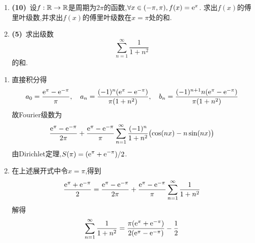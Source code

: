 \documentclass{ctexart}
\begin{document}
\begin{problem}[8.(15\songti{分})]
\begin{enumerate}[label=\tbf{(\arabic*)},topsep=0pt,parsep=0pt,itemsep=0pt,partopsep=0pt]
            \item \textbf{(10)}\ 设$f:\mathbb{R}\to\mathbb{R}$是周期为$2\pi$的函数,$\forall x\in(-\pi,\pi),f(x)=\mathrm{e}^x$.%
                求出$f(x)$的傅里叶级数,并求出$f(x)$的傅里叶级数在$x=\pi$处的和.
            \item \textbf{(5)}\ 求出级数
                \[\sum_{n=1}^{\infty}\dfrac{1}{1+n^2}\]
                的和.
        \end{enumerate}
\end{problem}
\begin{solution}
\begin{enumerate}[label=\tbf{(\arabic*)},topsep=0pt,parsep=0pt,itemsep=0pt,partopsep=0pt]
\item 直接积分得
\[a_0=\frac{\mathrm{e}^\pi-\mathrm{e}^{-\pi}}\pi,\quad
a_n=\frac{(-1)^n(\mathrm{e}^\pi-\mathrm{e}^{-\pi})}{\pi(1+n^2)},\quad
b_n=\frac{(-1)^{n+1}n(\mathrm{e}^\pi-\mathrm{e}^{-\pi})}{\pi(1+n^2)}\]
故Fourier级数为
\[\frac{\mathrm{e}^\pi-\mathrm{e}^{-\pi}}{2\pi}+
\frac{\mathrm{e}^\pi-\mathrm{e}^{-\pi}}\pi\sum_{n=1}^{\infty}\frac{(-1)^n}{1+n^2}
\bigl(\cos(nx)-n\sin(nx)\bigr)\]
由Dirichlet定理,$\displaystyle S(\pi)=(\mathrm{e}^\pi+\mathrm{e}^{-\pi})/2$.
\item 在上述展开式中令$x=\pi$,得到
\[\frac{\mathrm{e}^\pi+\mathrm{e}^{-\pi}}2
=\frac{\mathrm{e}^\pi-\mathrm{e}^{-\pi}}{2\pi}+
\frac{\mathrm{e}^\pi-\mathrm{e}^{-\pi}}\pi\sum_{n=1}^{\infty}\frac1{1+n^2}\]
解得
\[\sum_{n=1}^{\infty}\frac1{1+n^2}
=\frac{\pi(\mathrm{e}^\pi+\mathrm{e}^{-\pi})}{2(\mathrm{e}^\pi-\mathrm{e}^{-\pi})}-\frac12\]
\end{enumerate}
\end{solution}
\end{document}
